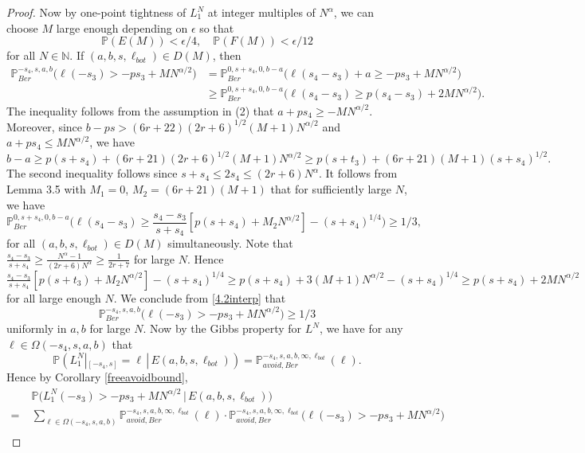\documentclass[12pt]{article}
\begin{document}
\begin{proof}
		Now by one-point tightness of $L_1^N$ at integer multiples of $N^\alpha$, we can choose $M$ large enough depending on $\epsilon$ so that
		\begin{equation}
		\mathbb{P}(E(M)) < \epsilon/4, \quad \mathbb{P}(F(M)) < \epsilon/12 \label{4.2EFbounds}
		\end{equation}
		for all $N\in\mathbb{N}$. If $(a,b,s,\ell_{bot})\in D(M)$, then
		\begin{align*}
		\mathbb{P}^{-s_4,s,a,b}_{Ber}\Big( \ell(-s_3) > -ps_3 + MN^{\alpha/2}\Big) &= \mathbb{P}^{0,s+s_4,0,b-a}_{Ber}\Big(\ell(s_4-s_3) + a \geq -ps_3 + MN^{\alpha/2}\Big)\\
		&\geq \mathbb{P}^{0,s+s_4,0,b-a}_{Ber}\Big(\ell(s_4-s_3) \geq p(s_4-s_3) + 2MN^{\alpha/2}\Big).
		\end{align*}
		The inequality follows from the assumption in (2) that $a+ps_4 \geq -MN^{\alpha/2}$. Moreover, since $b-ps > (6r+22)(2r+6)^{1/2}(M+1)N^{\alpha/2}$ and $a+ps_4 \leq MN^{\alpha/2}$, we have 
		\[
		b-a \geq p(s+s_4) + (6r+21)(2r+6)^{1/2}(M+1)N^{\alpha/2} \geq p(s+t_3) + (6r+21)(M+1)(s+s_4)^{1/2}.
		\]  
		 The second inequality follows since $s+s_4 \leq 2s_4 \leq (2r+6)N^{\alpha}$. It follows from Lemma 3.5 with $M_1 = 0$, $M_2 = (6r+21)(M+1)$ that for sufficiently large $N$, we have
		\begin{equation}
		 \mathbb{P}^{0,s+s_4,0,b-a}_{Ber}\Big(\ell(s_4-s_3) \geq \frac{s_4-s_3}{s+s_4}[p(s+s_4) + M_2 N^{\alpha/2}] - (s+s_4)^{1/4}\Big) \geq 1/3, \label{4.2interp}
		\end{equation}
		for all $(a,b,s,\ell_{bot}) \in D(M)$ simultaneously. Note that $\frac{s_4-s_3}{s+s_4} \geq \frac{N^\alpha - 1}{(2r+6)N^\alpha} \geq \frac{1}{2r+7}$
		for large $N$. Hence $\frac{s_4-s_3}{s+s_4}[p(s+t_3) + M_2 N^{\alpha/2}] - (s+s_4)^{1/4} \geq p(s+s_4) + 3(M+1)N^{\alpha/2} - (s+s_4)^{1/4}\geq p(s+s_4) + 2MN^{\alpha/2}$ for all large enough $N$. We conclude from \eqref{4.2interp} that
		\[
		\mathbb{P}^{-s_4,s,a,b}_{Ber}\Big(\ell(-s_3) > -ps_3 + MN^{\alpha/2}\Big) \geq 1/3
		\]
		uniformly in $a,b$ for large $N$. Now by the Gibbs property for $L^N$, we have for any $\ell\in\Omega(-s_4,s,a,b)$ that
		\[
		\mathbb{P}(L_1^N|_{[-s_4,s]} = \ell\,|\,E(a,b,s,\ell_{bot})) = \mathbb{P}^{-s_4,s,a,b,\infty,\ell_{bot}}_{avoid, Ber}(\ell).
		\]
		Hence by Corollary \ref{freeavoidbound},
		\begin{align*}
		&\mathbb{P}\big( L_1^N(-s_3) > -ps_3 + MN^{\alpha/2}\,\big|\,E(a,b,s,\ell_{bot})\big)\\
		= \; & \sum_{\ell\in\Omega(-s_4,s,a,b)} \mathbb{P}^{-s_4,s,a,b,\infty,\ell_{bot}}_{avoid, Ber}(\ell)\cdot \mathbb{P}^{-s_4,s,a,b,\infty,\ell_{bot}}_{avoid, Ber}\big(\ell(-s_3) > -ps_3 + MN^{\alpha/2}\big)\\

\end{align*}
\end{proof}
\end{document}
